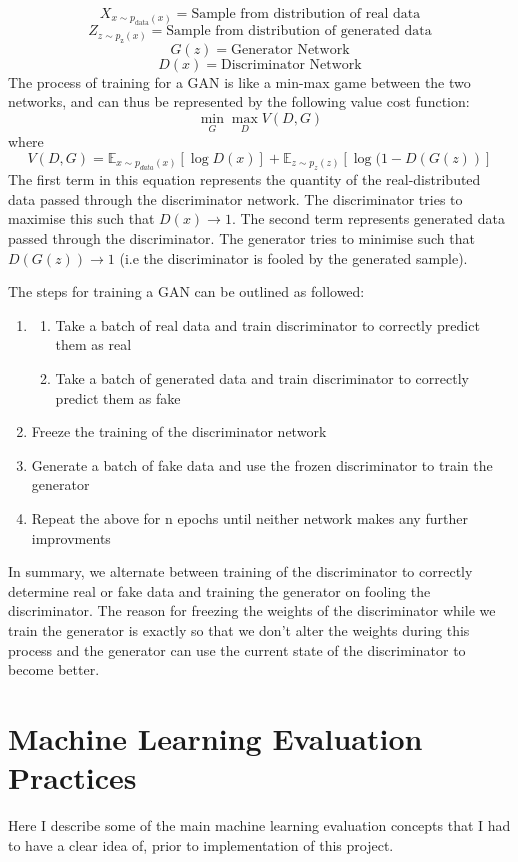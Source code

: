 \documentclass[12pt,a4paper,twoside]{report}
\begin{document}
$$X_{x\sim p_\text{data}(x)} = \text{Sample from distribution of real data} $$
$$Z_{z\sim p_\text{z}(x)} = \text{Sample from distribution of generated data} $$
$$G(z) = \text{Generator Network}$$
$$D(x) = \text{Discriminator Network}$$
The process of training for a GAN is like a min-max game between the two networks, and can thus be represented by the following value cost function:
$$\min _ { G } \max _ { D } V ( D ,G )$$
where 
$$V ( D ,G ) = \mathbb { E } _ { x \sim p _ { d a t a } ( x ) } [ \log D ( x ) ] + \mathbb { E } _ { z \sim p _ { z } ( z ) }[ \log ( 1- D ( G ( z ) ) ] $$
The first term in this equation represents the quantity of the real-distributed data passed through the discriminator network. The discriminator tries to maximise this such that $D(x)\rightarrow 1$. The second term represents generated data passed through the discriminator. The generator tries to minimise such that $D(G(z))\rightarrow 1$ (i.e the discriminator is fooled by the generated sample).

The steps for training a GAN can be outlined as followed:
\begin{enumerate}[Step 1:]
  \item 
  \begin{enumerate}
  \item Take a batch of real data and train discriminator to correctly predict them as real
  \item Take a batch of generated data and train discriminator to correctly predict them as fake
\end{enumerate}
  
  \item Freeze the training of the discriminator network
  \item Generate a batch of fake data and use the frozen discriminator to train the generator
  \item Repeat the above for n epochs until neither network makes any further improvments
\end{enumerate}

In summary, we alternate between training of the discriminator to correctly determine real or fake data and training the generator on fooling the discriminator. The reason for freezing the weights of the discriminator while we train the generator is exactly so that we don't alter the weights during this process and the generator can use the current state of the discriminator to become better.

\section{Machine Learning Evaluation Practices}
Here I describe some of the main machine learning evaluation concepts that I had to have a clear idea of, prior to implementation of this project. 
\end{document}
